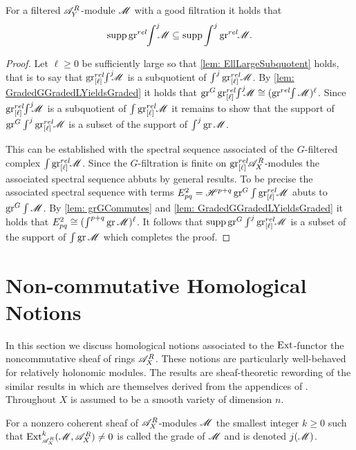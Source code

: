 \begin{proposition}\label{prop: SuppGrrelIntInclusion}
  For a filtered $\mathscr{A}_Y^R$-module $\mathscr{M}$ with a good filtration it holds that  $$\operatorname{supp} \operatorname{gr}^{rel}\mkern-5mu\int^j \mkern -8mu\mathscr{M} \subseteq \operatorname{supp} \int^j \operatorname{gr}^{rel}\mkern-5mu\mathscr{M}.$$
\end{proposition}
\begin{proof}
  Let $\ell\geq 0$ be sufficiently large so that \cref{lem: EllLargeSubquotent} holds, that is to say that $\operatorname{gr}_{[\ell]}^{rel}\mkern-5mu\int^j \mkern -8mu \mathscr{M}$ is a subquotient of $\int^j \operatorname{gr}_{[\ell]}^{rel}\mkern-5mu \mathscr{M}$.
  By \cref{lem: GradedGGradedLYieldsGraded} it holds that $\operatorname{gr}^G\operatorname{gr}_{[\ell]}^{rel}\mkern-5mu \int^j \mkern -8mu \mathscr{M} \cong (\operatorname{gr}^{rel}\mkern-5mu\int\mathscr{M})^\ell$.
  Since $\operatorname{gr}_{[\ell]}^{rel}\mkern-5mu \int^j \mkern -8mu \mathscr{M}$ is a subquotient of $\int \operatorname{gr}_{[\ell]}^{rel}\mkern-5mu\mathscr{M}$ it remains to show that the support of $\operatorname{gr}^G \int^j \operatorname{gr}_{[\ell]}^{rel}\mkern-5mu\mathscr{M}$ is a subset of the support of $\int^j \operatorname{gr} \mathscr{M}$.

  This can be established with the spectral sequence associated of the $G$-filtered complex $\int \operatorname{gr}_{[\ell]}^{rel}\mkern-5mu \mathscr{M}$. Since the $G$-filtration is finite on $\operatorname{gr}_{[\ell]}^{rel}\mkern-5mu\mathscr{A}_X^R$-modules the associated spectral sequence abbuts by general results. To be precise the associated spectral sequence with terms
  $E^2_{pq} = \mathscr{H}^{p+q}\operatorname{gr}^G \int \operatorname{gr}_{[\ell]}^{rel}\mkern-5mu \mathscr{M}$ abuts to $\operatorname{gr}^G\int \mathscr{M}$.
  By \cref{lem: grGCommutes} and \cref{lem: GradedGGradedLYieldsGraded} it holds that $E^2_{pq} \cong (\int^{p+q}\operatorname{gr} \mathscr{M})^\ell$. 
  It follows that $\operatorname{supp}\operatorname{gr}^G \int^j \operatorname{gr}_{[\ell]}^{rel}\mkern-5mu\mathscr{M}$ is a subset of the support of $\int \operatorname{gr} \mathscr{M}$ which completes the proof.
\end{proof}

\section{Non-commutative Homological Notions}
In this section we discuss homological notions associated to the $\operatorname{Ext}$-functor the noncommutative sheaf of rings $\mathscr{A}_X^R$. These notions are particularly well-behaved for relatively holonomic modules.
The results are sheaf-theoretic rewording of the similar results in \cite{budur2019zero} which are themselves derived  from the appendices of \cite{bjork1993analytic}.
Throughout $X$ is assumed to be a smooth variety of dimension $n$.
\begin{definition}
  For a nonzero coherent sheaf of $\mathscr{A}_X^R$-modules $\mathscr{M}$ the smallest integer $k\geq 0$ such that $\Ex{\A_X^R}{k}(\M,\A_X^R)\neq 0$ is called the grade of $\mathscr{M}$ and is denoted $j(\mathscr{M})$.
\end{definition}


